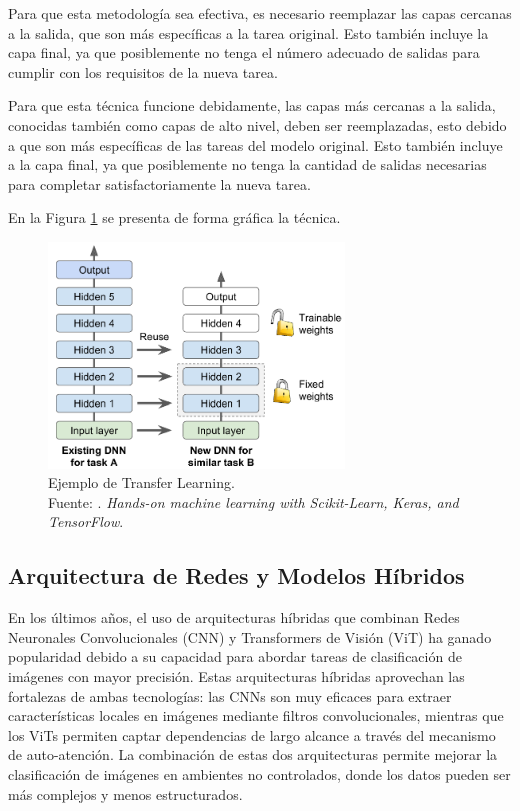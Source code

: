 Para que esta metodología sea efectiva, es necesario reemplazar las capas cercanas a la salida, que son más específicas a la tarea original. Esto también incluye la capa final, ya que posiblemente no tenga el número adecuado de salidas para cumplir con los requisitos de la nueva tarea.

Para que esta técnica funcione debidamente, las capas más cercanas a la salida, conocidas también como capas de alto nivel, deben ser reemplazadas, esto debido a que son más específicas de las tareas del modelo original. Esto también incluye a la capa final, ya que posiblemente no tenga la cantidad de salidas necesarias para completar satisfactoriamente la nueva tarea.

En la Figura \ref{2:fig211} se presenta de forma gráfica la técnica.

\begin{figure}[H]
	\begin{center}
		\includegraphics[width=0.70\textwidth]{2/figures/transfer_learning.PNG}
		\caption[Ejemplo de Transfer Learning]{Ejemplo de Transfer Learning. \\
		Fuente: \cite{bk_geron2022handml}. \textit{Hands-on machine learning with Scikit-Learn, Keras, and TensorFlow}.}
		\label{2:fig211}
	\end{center}
\end{figure}


\subsection{Arquitectura de Redes y Modelos Híbridos}
En los últimos años, el uso de arquitecturas híbridas que combinan Redes Neuronales Convolucionales (CNN) y Transformers de Visión (ViT) ha ganado popularidad debido a su capacidad para abordar tareas de clasificación de imágenes con mayor precisión. Estas arquitecturas híbridas aprovechan las fortalezas de ambas tecnologías: las CNNs son muy eficaces para extraer características locales en imágenes mediante filtros convolucionales, mientras que los ViTs permiten captar dependencias de largo alcance a través del mecanismo de auto-atención. La combinación de estas dos arquitecturas permite mejorar la clasificación de imágenes en ambientes no controlados, donde los datos pueden ser más complejos y menos estructurados.

